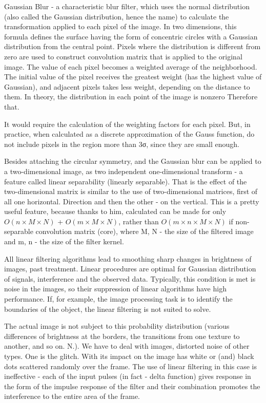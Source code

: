 Gaussian Blur - a characteristic blur filter, which uses the normal distribution (also called the Gaussian distribution, hence the name) to calculate the transformation applied to each pixel of the image. In two dimensions, this formula defines the surface having the form of concentric circles with a Gaussian distribution from the central point. Pixels where the distribution is different from zero are used to construct convolution matrix that is applied to the original image. The value of each pixel becomes a weighted average of the neighborhood. The initial value of the pixel receives the greatest weight (has the highest value of Gaussian), and adjacent pixels takes less weight, depending on the distance to them. In theory, the distribution in each point of the image is nonzero Therefore that. 

It would require the calculation of the weighting factors for each pixel. But, in practice, when calculated as a discrete approximation of the Gauss function, do not include pixels in the region more than 3σ, since they are small enough. 

Besides attaching the circular symmetry, and the Gaussian blur can be applied to a two-dimensional image, as two independent one-dimensional transform - a feature called linear separability (linearly separable). That is the effect of the two-dimensional matrix is similar to the use of two-dimensional matrices, first of all one horizontal. Direction and then the other - on the vertical. This is a pretty useful feature, because thanks to him, calculated can be made for only $O (n \times M \times N)$ + $O (m \times M \times N)$, rather than $O (m \times n \times M \times N)$ if non-separable convolution matrix (core), where M, N - the size of the filtered image and m, n - the size of the filter kernel.

All linear filtering algorithms lead to smoothing sharp changes in brightness of images, past treatment. Linear procedures are optimal for Gaussian distribution of signals, interference and the observed data. Typically, this condition is met is noise in the images, so their suppression of linear algorithms have high performance. If, for example, the image processing task is to identify the boundaries of the object, the linear filtering is not suited to solve.

The actual image is not subject to this probability distribution (various differences of brightness at the borders, the transitions from one texture to another, and so on. N.). We have to deal with images, distorted noise of other types. One is the glitch. With its impact on the image has white or (and) black dots scattered randomly over the frame. The use of linear filtering in this case is ineffective - each of the input pulses (in fact - delta function) gives response in the form of the impulse response of the filter and their combination promotes the interference to the entire area of the frame.

